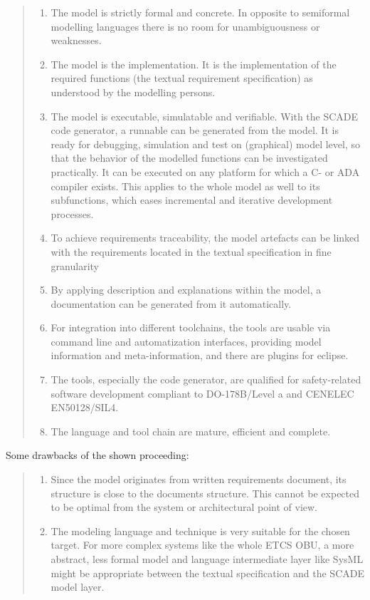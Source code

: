 \documentclass{template/openetcs_article}
\begin{document}
\begin{quote}
	
	\begin{enumerate}
		\item The model is strictly formal and concrete. In opposite to semiformal modelling languages there is no room for unambiguousness or weaknesses.
		\item The model is the implementation. It is the implementation of the required functions (the textual requirement specification) as understood by the modelling persons.
		\item The model is executable, simulatable and verifiable. With the SCADE code generator, a runnable can be generated from the model. It is ready for debugging, simulation and test on (graphical) model level, so that the behavior of the modelled functions can be investigated practically. It can be executed on any platform for which a C- or ADA compiler exists. This applies to the whole model as well to its subfunctions, which eases incremental and iterative development processes.
		\item To achieve requirements traceability, the model artefacts can be linked with the requirements located in the textual specification in fine granularity
		\item By applying description and explanations within the model, a documentation can be generated from it automatically.
		\item For integration into different toolchains, the tools are usable via command line and automatization interfaces, providing model information and meta-information, and there are plugins for eclipse.
		\item The tools, especially the code generator,  are qualified for safety-related software development compliant to DO-178B/Level a and CENELEC EN50128/SIL4.
		\item The language and tool chain are mature, efficient and complete.
	\end{enumerate}
	
\end{quote}

Some drawbacks of the shown proceeding:

\begin{quote}
	
	\begin{enumerate}
		\item Since the model originates from written requirements document, its structure is close to the documents structure. This cannot be expected to be optimal from the system or architectural point of view.
		\item The modeling language and technique is very suitable for the chosen target. For more complex systems like the whole ETCS OBU, a more abstract, less formal model and language intermediate layer like SysML might be appropriate between the textual specification and the SCADE model layer.
	\end{enumerate}
	
\end{quote}
\end{document}
